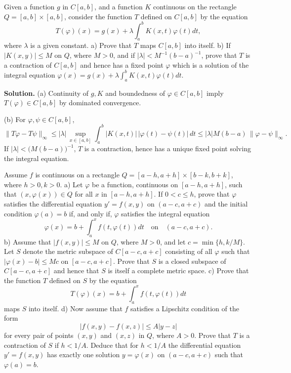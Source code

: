 \begin{problembox}
Given a function $g$ in $C[a, b]$, and a function $K$ continuous on the rectangle $Q = [a, b] \times [a, b]$, consider the function $T$ defined on $C[a, b]$ by the equation 
\[T(\varphi)(x) = g(x) + \lambda \int_a^b K(x, t)\varphi(t) dt,\]
where $\lambda$ is a given constant.
a) Prove that $T$ maps $C[a, b]$ into itself.
b) If $|K(x, y)| \leq M$ on $Q$, where $M > 0$, and if $|\lambda| < M^{-1}(b - a)^{-1}$, prove that $T$ is a contraction of $C[a, b]$ and hence has a fixed point $\varphi$ which is a solution of the integral equation $\varphi(x) = g(x) + \lambda \int_a^b K(x, t)\varphi(t) dt$.
\end{problembox}

\noindent\textbf{Solution.}
(a) Continuity of $g,K$ and boundedness of $\varphi\in C[a,b]$ imply $T(\varphi)\in C[a,b]$ by dominated convergence.

(b) For $\varphi,\psi\in C[a,b]$,
\[\|T\varphi-T\psi\|_\infty \le |\lambda|\,\sup_{x\in[a,b]}\int_a^b |K(x,t)|\,|\varphi(t)-\psi(t)|\,dt \le |\lambda|M(b-a)\,\|\varphi-\psi\|_\infty.
\]
If $|\lambda|<\big(M(b-a)\big)^{-1}$, $T$ is a contraction, hence has a unique fixed point solving the integral equation.
\medskip

\begin{problembox}
Assume $f$ is continuous on a rectangle $Q = [a - h, a + h] \times [b - k, b + k]$, where $h > 0, k > 0$.
a) Let $\varphi$ be a function, continuous on $[a - h, a + h]$, such that $(x, \varphi(x)) \in Q$ for all $x$ in $[a - h, a + h]$. If $0 < c \leq h$, prove that $\varphi$ satisfies the differential equation $y' = f(x, y)$ on $(a - c, a + c)$ and the initial condition $\varphi(a) = b$ if, and only if, $\varphi$ satisfies the integral equation 
\[\varphi(x) = b + \int_a^x f(t, \varphi(t)) dt \quad \text{on} \quad (a - c, a + c).\]
b) Assume that $|f(x, y)| \leq M$ on $Q$, where $M > 0$, and let $c = \min \{h, k/M\}$. Let $S$ denote the metric subspace of $C[a - c, a + c]$ consisting of all $\varphi$ such that $|\varphi(x) - b| \leq Mc$ on $[a - c, a + c]$. Prove that $S$ is a closed subspace of $C[a - c, a + c]$ and hence that $S$ is itself a complete metric space.
c) Prove that the function $T$ defined on $S$ by the equation 
\[T(\varphi)(x) = b + \int_a^x f(t, \varphi(t)) dt\]
maps $S$ into itself.
d) Now assume that $f$ satisfies a Lipschitz condition of the form 
\[|f(x, y) - f(x, z)| \leq A|y - z|\]
for every pair of points $(x, y)$ and $(x, z)$ in $Q$, where $A > 0$. Prove that $T$ is a contraction of $S$ if $h < 1/A$. Deduce that for $h < 1/A$ the differential equation $y' = f(x, y)$ has exactly one solution $y = \varphi(x)$ on $(a - c, a + c)$ such that $\varphi(a) = b$.
\end{problembox}

